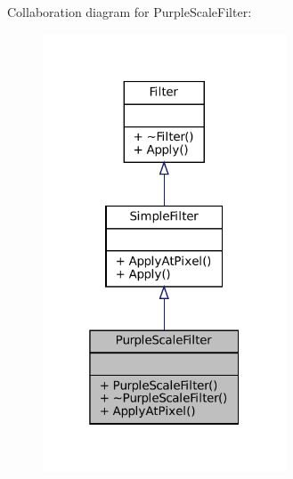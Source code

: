 Collaboration diagram for Purple\+Scale\+Filter\+:\nopagebreak
\begin{figure}[H]
\begin{center}
\leavevmode
\includegraphics[width=205pt]{classPurpleScaleFilter__coll__graph}
\end{center}
\end{figure}

